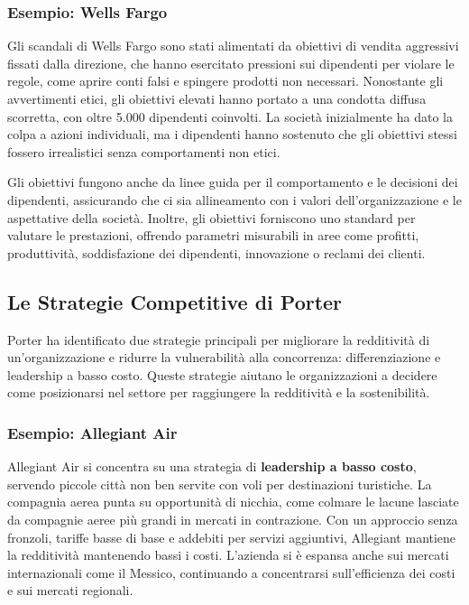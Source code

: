 \documentclass{article}
\begin{document}
\subsubsection{Esempio: Wells Fargo}
Gli scandali di Wells Fargo sono stati alimentati da obiettivi di vendita aggressivi fissati dalla direzione, che hanno esercitato pressioni sui dipendenti per violare le regole, come aprire conti falsi e spingere prodotti non necessari. Nonostante gli avvertimenti etici, gli obiettivi elevati hanno portato a una condotta diffusa scorretta, con oltre 5.000 dipendenti coinvolti. La società inizialmente ha dato la colpa a azioni individuali, ma i dipendenti hanno sostenuto che gli obiettivi stessi fossero irrealistici senza comportamenti non etici.

Gli obiettivi fungono anche da linee guida per il comportamento e le decisioni dei dipendenti, assicurando che ci sia allineamento con i valori dell’organizzazione e le aspettative della società. Inoltre, gli obiettivi forniscono uno standard per valutare le prestazioni, offrendo parametri misurabili in aree come profitti, produttività, soddisfazione dei dipendenti, innovazione o reclami dei clienti.

\subsection{Le Strategie Competitive di Porter}
Porter ha identificato due strategie principali per migliorare la redditività di un’organizzazione e ridurre la vulnerabilità alla concorrenza: differenziazione e leadership a basso costo. Queste strategie aiutano le organizzazioni a decidere come posizionarsi nel settore per raggiungere la redditività e la sostenibilità.

\subsubsection{Esempio: Allegiant Air}
Allegiant Air si concentra su una strategia di \textbf{leadership a basso costo}, servendo piccole città non ben servite con voli per destinazioni turistiche. La compagnia aerea punta su opportunità di nicchia, come colmare le lacune lasciate da compagnie aeree più grandi in mercati in contrazione. Con un approccio senza fronzoli, tariffe basse di base e addebiti per servizi aggiuntivi, Allegiant mantiene la redditività mantenendo bassi i costi. L’azienda si è espansa anche sui mercati internazionali come il Messico, continuando a concentrarsi sull’efficienza dei costi e sui mercati regionali.
\end{document}
